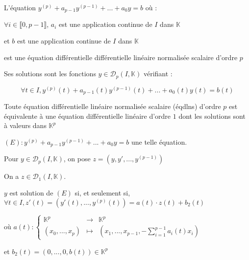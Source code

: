 \documentclass[a4paper,12pt]{book}
\newcommand{\Def}[2]{\begin{tcolorbox}[sharp corners, colback=white,colframe=blue!90!black!75, title=Définition : #1]#2\end{tcolorbox}}
\newcommand{\Prop}[2]{\begin{tcolorbox}[sharp corners, colback=white,colframe=red!90!black!75, title=Proposition : #1]#2\end{tcolorbox}}
\newcommand{\Pre}[1]{\begin{tcolorbox}[sharp corners, colback=white,colframe=green!60!green!30!black!75, title=Preuve]#1\end{tcolorbox}}
\def\K{\mathbb{K}}
\begin{document}
\Def{Equations différentielles linéaires normalisées scalaires d'ordre p}{L'équation $y^{(p)} + a_{p-1}y^{(p-1)}+...+a_0y = b$ où :
\par $\forall i\in\llbracket 0, p-1\rrbracket$, $a_i$ est une application continue de $I$ dans $\K$
\par et $b$ est une application continue de $I$ dans $\K$
\par est une équation différentielle différentielle linéaire normalisée scalaire d'ordre $p$
\par Ses solutions sont les fonctions $y\in\mathcal{D}_p(I, \K)$ vérifiant :\par $$\forall t\in I, y^{(p)}(t) + a_{p-1}(t)y^{(p-1)}(t)+...+a_0(t)y(t) =b(t)$$}
\Prop{Vectorialisation}{Toute équation différentielle linéaire normalisée scalaire (éqdlns) d'ordre $p$ est équivalente à une équation différentielle linéaire d'ordre $1$ dont les solutions sont à valeurs dans $\K^p$}
\Pre{$(E) : y^{(p)} + a_{p-1}y^{(p-1)}+...+a_0y = b$ une telle équation.
\par Pour $y\in\mathcal{D}_p(I, \K)$, on pose $z = (y, y', ..., y^{(p-1)})$
\par On a $z\in\mathcal{D}_1(I, \K)$.
\par $y$ est solution de $(E)$ si, et seulement si, $\forall t\in I, z'(t) = (y'(t),..., y^{(p)}(t)) = a(t)\cdot z(t) + b_2(t)$
\par où $a(t):\left\{\begin{array}{rcl} \K^p & \to & \K^p \\ (x_0,..., x_p) & \mapsto & (x_1,..., x_{{p-1}},-\sum\limits_{i=1}^{p-1}a_i(t)x_i)\end{array}\right.$
\par et $b_2(t) = (0,..., 0, b(t))\in\K^p$}
\end{document}
